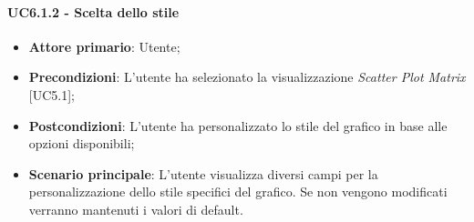 \paragraph{UC6.1.2 - Scelta dello stile}
\begin{itemize}
	\item \textbf{Attore primario}: Utente;
	\item \textbf{Precondizioni}: L'utente ha selezionato la visualizzazione \textit{Scatter Plot Matrix} [UC5.1];
	\item \textbf{Postcondizioni}: L'utente ha personalizzato lo stile del grafico in base alle opzioni disponibili;
	
	\item \textbf{Scenario principale}: L'utente visualizza diversi campi per la personalizzazione dello stile specifici del grafico. Se non vengono modificati verranno mantenuti i valori di default. 
\end{itemize}